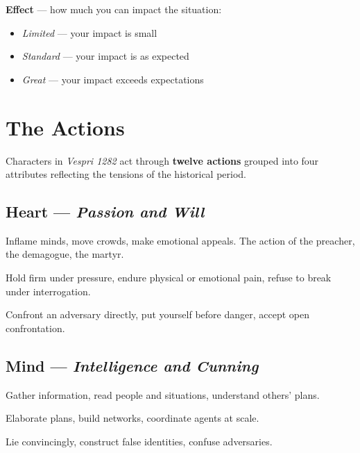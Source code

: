 \textbf{Effect} --- how much you can impact the situation:
\begin{itemize}[nosep]
  \item \textit{Limited} --- your impact is small
  \item \textit{Standard} --- your impact is as expected
  \item \textit{Great} --- your impact exceeds expectations
\end{itemize}


\secsep

\section{The Actions}

Characters in \textit{Vespri 1282} act through \textbf{twelve actions}
grouped into four attributes reflecting the tensions of the historical period.

\subsection{Heart --- \textit{Passion and Will}}

\begin{description}[leftmargin=2em, style=nextline]
  \item[\cinzel Incite] Inflame minds, move crowds, make emotional appeals.
    The action of the preacher, the demagogue, the martyr.
  \item[\cinzel Resist] Hold firm under pressure, endure physical or emotional
    pain, refuse to break under interrogation.
  \item[\cinzel Defy] Confront an adversary directly, put yourself before
    danger, accept open confrontation.
\end{description}

\subsection{Mind --- \textit{Intelligence and Cunning}}

\begin{description}[leftmargin=2em, style=nextline]
  \item[\cinzel Study] Gather information, read people and situations,
    understand others' plans.
  \item[\cinzel Plot] Elaborate plans, build networks, coordinate agents
    at scale.
  \item[\cinzel Deceive] Lie convincingly, construct false identities,
    confuse adversaries.
\end{description}

